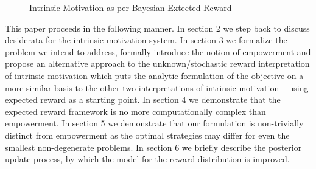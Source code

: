 \documentclass{article}
\begin{document}
\begin{figure}[h]
\centering
{}
\caption{Intrinsic Motivation as per Bayesian Extected Reward} \label{fig:M4}
\end{figure}

This paper proceeds in the following manner. In section 2 we step back to discuss desiderata for the intrinsic motivation system. In section 3 we formalize the problem we intend to address, formally introduce the notion of empowerment and propose an alternative approach to the unknown/stochastic reward interpretation of intrinsic motivation which puts the analytic formulation of the objective on a more similar basis to the other two interpretations of intrinsic motivation -- using expected reward as a starting point. In section 4 we demonstrate that the expected reward framework is no more computationally complex than empowerment. In section 5 we demonstrate that our formulation is non-trivially distinct from empowerment as the optimal strategies may differ for even the smallest non-degenerate problems. In section 6 we briefly describe the posterior update process, by which the model for the reward distribution is improved.  



\end{document}
